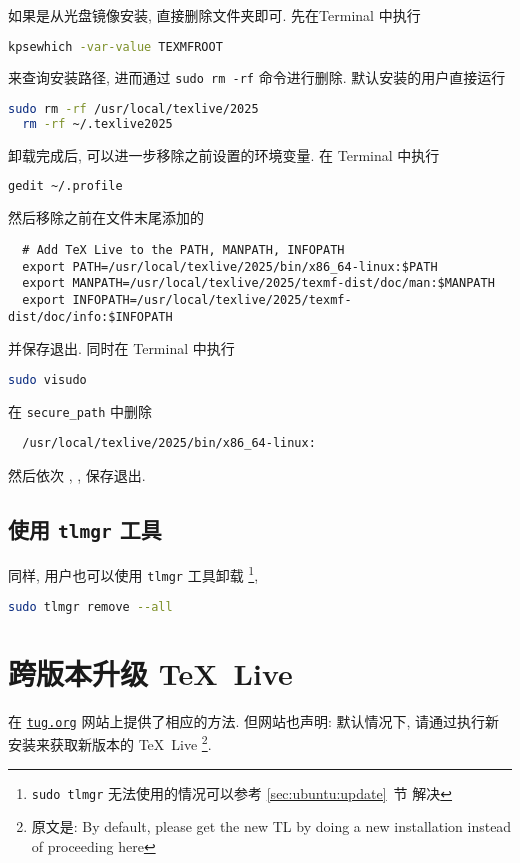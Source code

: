 如果是从光盘镜像安装,
直接删除文件夹即可.
先在\textsf{Terminal} 中执行
\begin{lstlisting}[language = bash]
  kpsewhich -var-value TEXMFROOT
\end{lstlisting}
来查询安装路径,
进而通过 \texttt{sudo rm -rf} 命令进行删除.
默认安装的用户直接运行
\begin{lstlisting}[language = bash]
  sudo rm -rf /usr/local/texlive/2025
  rm -rf ~/.texlive2025
\end{lstlisting}
卸载完成后, 可以进一步移除之前设置的环境变量.
在 \textsf{Terminal} 中执行
\begin{lstlisting}[language = bash]
  gedit ~/.profile
\end{lstlisting}
然后移除之前在文件末尾添加的
\begin{lstlisting}
  # Add TeX Live to the PATH, MANPATH, INFOPATH
  export PATH=/usr/local/texlive/2025/bin/x86_64-linux:$PATH
  export MANPATH=/usr/local/texlive/2025/texmf-dist/doc/man:$MANPATH
  export INFOPATH=/usr/local/texlive/2025/texmf-dist/doc/info:$INFOPATH
\end{lstlisting}
并保存退出.
同时在 \textsf{Terminal} 中执行
\begin{lstlisting}[language = bash]
  sudo visudo
\end{lstlisting}
在 \texttt{secure\_path} 中删除
\begin{lstlisting}
  /usr/local/texlive/2025/bin/x86_64-linux:
\end{lstlisting}
然后依次 , , \keys{\enter} 保存退出.

\subsection{使用 \texttt{tlmgr} 工具}

同样,
用户也可以使用 \texttt{tlmgr} 工具卸载%
\footnote{\texttt{sudo tlmgr} 无法使用的情况可以参考 \ref{sec:ubuntu:update}~节 解决},
\begin{lstlisting}[language=bash]
  sudo tlmgr remove --all
\end{lstlisting}

\section{跨版本升级 \TeX\ Live}\label{sec:ubuntu:version}

在 \href{https://www.tug.org/texlive/upgrade.html}{\texttt{tug.org}}
网站上提供了相应的方法.
但网站也声明:
默认情况下,
请通过执行新安装来获取新版本的 \TeX\ Live%
\footnote{原文是: By default,
  please get the new TL by doing a new installation instead of proceeding here}.
